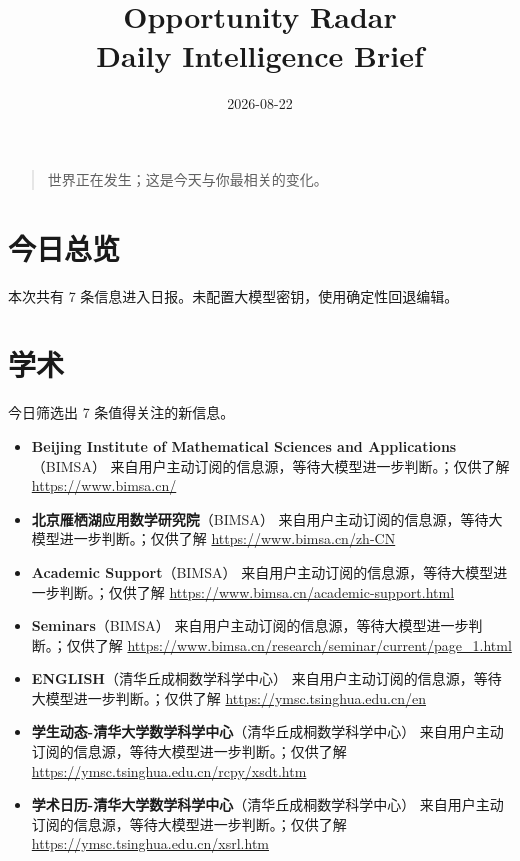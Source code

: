 \documentclass[11pt]{ctexart}
\title{Opportunity Radar\\Daily Intelligence Brief}
\date{2026-08-22}
\begin{document}
\maketitle
\begin{quote}\Large 世界正在发生；这是今天与你最相关的变化。\end{quote}
\section*{今日总览}
本次共有 7 条信息进入日报。未配置大模型密钥，使用确定性回退编辑。
\section*{学术}
今日筛选出 7 条值得关注的新信息。
\begin{itemize}
\item \textbf{Beijing Institute of Mathematical Sciences and Applications}（BIMSA） 来自用户主动订阅的信息源，等待大模型进一步判断。；仅供了解 \url{https://www.bimsa.cn/}
\item \textbf{北京雁栖湖应用数学研究院}（BIMSA） 来自用户主动订阅的信息源，等待大模型进一步判断。；仅供了解 \url{https://www.bimsa.cn/zh-CN}
\item \textbf{Academic Support}（BIMSA） 来自用户主动订阅的信息源，等待大模型进一步判断。；仅供了解 \url{https://www.bimsa.cn/academic-support.html}
\item \textbf{Seminars}（BIMSA） 来自用户主动订阅的信息源，等待大模型进一步判断。；仅供了解 \url{https://www.bimsa.cn/research/seminar/current/page_1.html}
\item \textbf{ENGLISH}（清华丘成桐数学科学中心） 来自用户主动订阅的信息源，等待大模型进一步判断。；仅供了解 \url{https://ymsc.tsinghua.edu.cn/en}
\item \textbf{学生动态-清华大学数学科学中心}（清华丘成桐数学科学中心） 来自用户主动订阅的信息源，等待大模型进一步判断。；仅供了解 \url{https://ymsc.tsinghua.edu.cn/rcpy/xsdt.htm}
\item \textbf{学术日历-清华大学数学科学中心}（清华丘成桐数学科学中心） 来自用户主动订阅的信息源，等待大模型进一步判断。；仅供了解 \url{https://ymsc.tsinghua.edu.cn/xsrl.htm}
\end{itemize}
\end{document}

